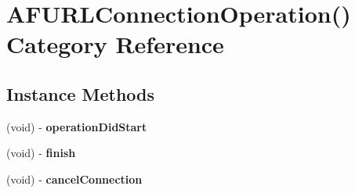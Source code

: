 \hypertarget{category_a_f_u_r_l_connection_operation_07_08}{}\section{A\+F\+U\+R\+L\+Connection\+Operation() Category Reference}
\label{category_a_f_u_r_l_connection_operation_07_08}
\subsection*{Instance Methods}
\begin{DoxyCompactItemize}
\item 
\hypertarget{category_a_f_u_r_l_connection_operation_07_08_adb3f442720957460984d98ba4656f237}{}(void) -\/ {\bfseries operation\+Did\+Start}\label{category_a_f_u_r_l_connection_operation_07_08_adb3f442720957460984d98ba4656f237}

\item 
\hypertarget{category_a_f_u_r_l_connection_operation_07_08_afa07116e9179944df7fcb762c8c4ddd3}{}(void) -\/ {\bfseries finish}\label{category_a_f_u_r_l_connection_operation_07_08_afa07116e9179944df7fcb762c8c4ddd3}

\item 
\hypertarget{category_a_f_u_r_l_connection_operation_07_08_a049154202d6a6d7fddab2c887b411b66}{}(void) -\/ {\bfseries cancel\+Connection}\label{category_a_f_u_r_l_connection_operation_07_08_a049154202d6a6d7fddab2c887b411b66}

\end{DoxyCompactItemize}
